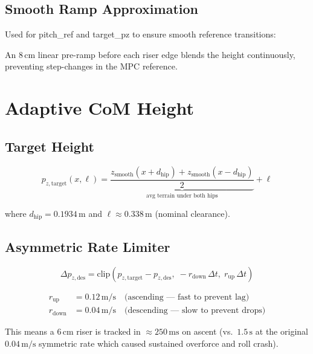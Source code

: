\documentclass[12pt,a4paper]{report}
\begin{document}
\subsection{Smooth Ramp Approximation}

Used for pitch\_ref and target\_pz to ensure smooth reference transitions:

An $8\,\text{cm}$ linear pre-ramp before each riser edge blends the height
continuously, preventing step-changes in the MPC reference.

\section{Adaptive CoM Height}

\subsection{Target Height}

\begin{equation}
    p_{z,\text{target}}(x, \ell) =
    \underbrace{\frac{z_\text{smooth}(x + d_\text{hip}) + z_\text{smooth}(x - d_\text{hip})}{2}}_{\text{avg terrain under both hips}}
    + \ell
\end{equation}

where $d_\text{hip} = 0.1934\,\text{m}$ and $\ell \approx 0.338\,\text{m}$ (nominal clearance).

\subsection{Asymmetric Rate Limiter}

\begin{equation}
    \Delta p_{z,\text{des}} = \text{clip}\!\left(p_{z,\text{target}} - p_{z,\text{des}},\;
    -r_\text{down}\,\Delta t,\; r_\text{up}\,\Delta t\right)
\end{equation}

\begin{align}
    r_\text{up}   &= 0.12\,\text{m/s} \quad\text{(ascending — fast to prevent lag)} \\
    r_\text{down} &= 0.04\,\text{m/s} \quad\text{(descending — slow to prevent drops)}
\end{align}

This means a $6\,\text{cm}$ riser is tracked in $\approx 250\,\text{ms}$ on
ascent (vs.\ $1.5\,\text{s}$ at the original $0.04\,\text{m/s}$ symmetric rate
which caused sustained overforce and roll crash).
\end{document}
